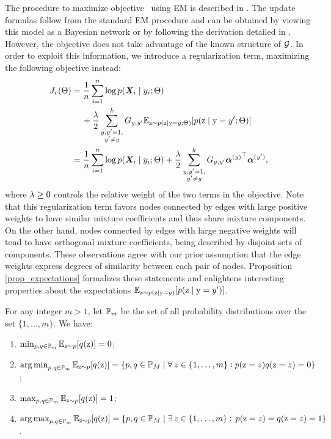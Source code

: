 The procedure to maximize objective~ using EM is described in . The update formulas follow from the standard EM procedure and can be obtained by viewing this model as a Bayesian network or by following the derivation detailed in . However, the objective  does not take advantage of the known structure of ${\mathcal{G}}$. In order to exploit this information, we introduce a regularization term, maximizing the following objective instead:
\begin{align}
\label{eq:spamhmm_objective}
J_r(\Theta) &= \frac{1}{n}\sum_{i=1}^n \log p({\bm{X}}_i \mid y_i; \Theta) \nonumber\\ 
&\mathbin{\hphantom{=}}{}+ \frac{\lambda}{2} \sum_{\substack{y,y'=1,\\y'\neq y}}^{k} {G}_{y,y'} \mathbb{E}_{{\textnormal{z}} \sim p({\textnormal{z}} \mid {\textnormal{y}}=y; \Theta)} [ p({\textnormal{z}} \mid {\textnormal{y}}=y'; \Theta) ] \nonumber\\
&= \frac{1}{n}\sum_{i=1}^n \log p({\bm{X}}_i \mid y_i; \Theta) + \frac{\lambda}{2} \sum_{\substack{y,y'=1,\\y'\neq y}}^{k} {G}_{y,y'} {{\bm{\alpha}}^{(y)}}^\top {\bm{\alpha}}^{(y')},
\end{align}
where $\lambda \geq 0$ controls the relative weight of the two terms in the objective. Note that this regularization term favors nodes connected by edges with large positive weights to have similar mixture coefficients and thus share mixture components. On the other hand, nodes connected by edges with large negative weights will tend to have orthogonal mixture coefficients, being described by disjoint sets of components. These observations agree with our prior assumption that the edge weights express degrees of similarity between each pair of nodes. Proposition \ref{prop_expectations} formalizes these statements and enlightens interesting properties about the expectations $\mathbb{E}_{{\textnormal{z}} \sim p({\textnormal{z}} \mid {\textnormal{y}}=y)} [ p({\textnormal{z}} \mid {\textnormal{y}}=y')]$.
\begin{proposition}
	\label{prop_expectations}
	For any integer $m>1$, let ${\mathbb{P}}_m$ be the set of all probability distributions over the set $\{1,\dots,m\}$. We have:
	\begin{enumerate}
		\item $\min_{p,q \in {\mathbb{P}}_m} \mathbb{E}_{{\textnormal{z}}\sim p} [ q({\textnormal{z}}) ] = 0$; \label{prop_min}
		\item $\operatorname*{arg\,min}_{p,q \in {\mathbb{P}}_m} \mathbb{E}_{{\textnormal{z}}\sim p} [ q({\textnormal{z}}) ] = \{p,q \in {\mathbb{P}}_M \mid \forall \, z \in \{1,\dots,m\}: p({\textnormal{z}} = z)q({\textnormal{z}} = z)=0\}$; \label{prop_argmin}
		\item $\max_{p,q \in {\mathbb{P}}_m} \mathbb{E}_{{\textnormal{z}}\sim p} [ q({\textnormal{z}}) ] = 1$; \label{prop_max}
		\item $\operatorname*{arg\,max}_{p,q \in {\mathbb{P}}_m} \mathbb{E}_{{\textnormal{z}}\sim p} [ q({\textnormal{z}}) ] = \{p,q \in {\mathbb{P}}_M \mid \exists \, z \in \{1,\dots,m\} : \, p({\textnormal{z}} = z)=q({\textnormal{z}} = z)=1\}$ \label{prop_argmax}.
	\end{enumerate}
\end{proposition}
